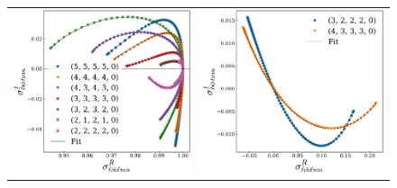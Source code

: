 \documentclass[twocolumn,aps,prd,floatfix,preprintnumbers,a4paper,nofootinbib,
superscriptaddress,10pt]{revtex4-1}
\begin{document}
\begin{figure}[htb]
  \begin{tabular}{lr}
    \includegraphics[width=\figfactor\textwidth]{fig/issue2_ysprod_1.pdf} & \includegraphics[width=\figfactor\textwidth]{fig/issue2_ysprod_2.pdf} \\

\end{tabular}
\end{figure}
\end{document}
